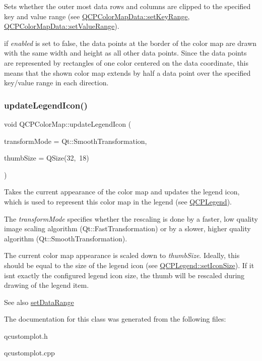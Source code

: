 Sets whether the outer most data rows and columns are clipped to the specified key and value range (see \hyperlink{classQCPColorMapData_a0738c485f3c9df9ea1241b7a8bb6a86e}{Q\+C\+P\+Color\+Map\+Data\+::set\+Key\+Range}, \hyperlink{classQCPColorMapData_ada1b2680ba96a5f4175b6d341cf75d23}{Q\+C\+P\+Color\+Map\+Data\+::set\+Value\+Range}).

if {\itshape enabled} is set to false, the data points at the border of the color map are drawn with the same width and height as all other data points. Since the data points are represented by rectangles of one color centered on the data coordinate, this means that the shown color map extends by half a data point over the specified key/value range in each direction.

\mbox{\label{classQCPColorMap_a5d8158b62d55fcfeaabcb68ce0083e87}} 
\subsubsection{\texorpdfstring{update\+Legend\+Icon()}{updateLegendIcon()}}
{\footnotesize\ttfamily void Q\+C\+P\+Color\+Map\+::update\+Legend\+Icon (\begin{DoxyParamCaption}\item[{Qt\+::\+Transformation\+Mode}]{transform\+Mode = {\ttfamily Qt\+:\+:SmoothTransformation},  }\item[{const Q\+Size \&}]{thumb\+Size = {\ttfamily QSize(32,~18)} }\end{DoxyParamCaption})}

Takes the current appearance of the color map and updates the legend icon, which is used to represent this color map in the legend (see \hyperlink{classQCPLegend}{Q\+C\+P\+Legend}).

The {\itshape transform\+Mode} specifies whether the rescaling is done by a faster, low quality image scaling algorithm (Qt\+::\+Fast\+Transformation) or by a slower, higher quality algorithm (Qt\+::\+Smooth\+Transformation).

The current color map appearance is scaled down to {\itshape thumb\+Size}. Ideally, this should be equal to the size of the legend icon (see \hyperlink{classQCPLegend_a8b0740cce488bf7010da6beda6898984}{Q\+C\+P\+Legend\+::set\+Icon\+Size}). If it isn\textquotesingle{}t exactly the configured legend icon size, the thumb will be rescaled during drawing of the legend item.

\begin{DoxySeeAlso}{See also}
\hyperlink{classQCPColorMap_a980b42837821159786a85b4b7dcb8774}{set\+Data\+Range} 
\end{DoxySeeAlso}


The documentation for this class was generated from the following files\+:\begin{DoxyCompactItemize}
\item 
qcustomplot.\+h\item 
qcustomplot.\+cpp\end{DoxyCompactItemize}

